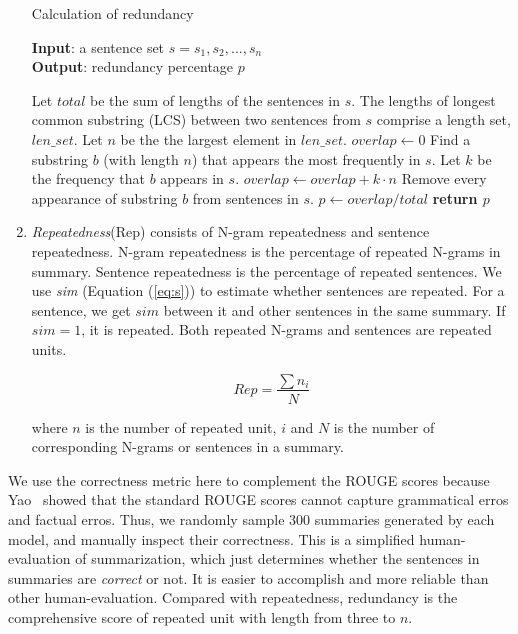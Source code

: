 \begin{enumerate}
\begin{algorithm}[tb]
\caption{Calculation of redundancy}
\scriptsize
\label{alg:red}
\textbf{Input}: a sentence set $s = {s_{1}, s_{2},...,s_{n}}$\\
\textbf{Output}: redundancy percentage $p$
\begin{algorithmic}[1] %
\STATE Let $total$ be the sum of lengths of the sentences in $s$.
\STATE The lengths of longest common substring (LCS) between two sentences from $s$ comprise a length set, $len\_set$.
\STATE Let $n$ be the the largest element in $len\_set$.
\STATE $overlap \leftarrow 0$
\STATE Find a substring $b$ (with length $n$) that appears the most frequently in $s$.
\STATE Let $k$ be the frequency that $b$ appears in $s$.
\STATE $overlap \leftarrow overlap + k\cdot n$
\STATE Remove every appearance of substring $b$ from sentences in $s$.
\ENDWHILE
\STATE $p \leftarrow overlap/total$
\STATE \textbf{return $p$} 
\end{algorithmic}
\end{algorithm}

\item \textit{Repeatedness}(Rep) consists of N-gram repeatedness
and sentence repeatedness. N-gram repeatedness is
the percentage of repeated N-grams in summary. Sentence
repeatedness is the percentage of repeated sentences.
We use \textit{sim} (Equation (\ref{eq:s})) to estimate
whether sentences are repeated. 
For a sentence, we get $sim$ between it and other sentences
in the same summary. If $sim=1$, it is repeated.
Both repeated N-grams and sentences are repeated units.

\begin{equation}
Rep = \frac{\sum{n_{i}}}{N}
\end{equation}

where $n$ is the number of repeated unit, $i$ 
and $N$ is the number of corresponding N-grams or sentences in a summary.

\end{enumerate}

We use the correctness metric here to complement the ROUGE 
scores because Yao~ showed that the standard ROUGE scores
cannot capture grammatical erros and factual erros. 
Thus, we randomly sample 300 summaries generated by each model, 
and manually inspect their correctness. 
This is a simplified
human-evaluation of summarization, which just
determines whether the sentences in summaries are \textit{correct} or not.
It is easier to accomplish and more reliable than other human-evaluation. 
Compared with repeatedness, redundancy is the comprehensive score 
of repeated unit with length from three to $n$. 

